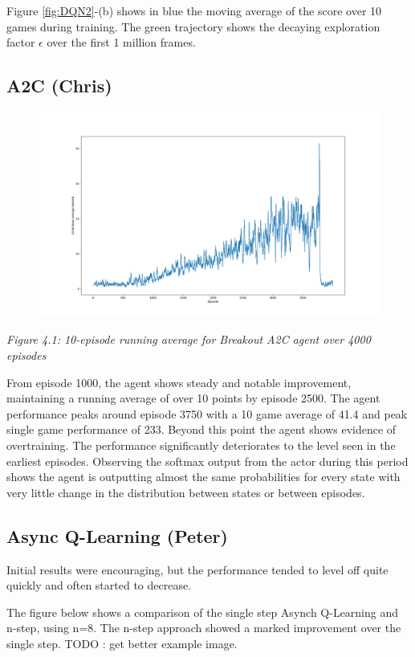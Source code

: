 \documentclass{article}
\begin{document}
Figure \ref{fig:DQN2}-(b) shows in blue the moving average of the score over 10 games during training. The green trajectory shows the decaying exploration factor $\epsilon$ over the first 1 million frames. 


\subsection{A2C (Chris)}

\begin{figure}[h]
\includegraphics[scale=0.2]{A2C4000.png}
\end{figure}
\emph{Figure 4.1: 10-episode running average for Breakout A2C agent over 4000 episodes}

From episode 1000, the agent shows steady and notable improvement, maintaining a running average of over 10 points by episode 2500. The agent performance peaks around episode 3750 with a 10 game average of 41.4 and peak single game performance of 233. Beyond this point the agent shows evidence of overtraining. The performance significantly deteriorates to the level seen in the earliest episodes. Observing the softmax output from the actor during this period shows the agent is outputting almost the same probabilities for every state with very little change in the distribution between states or between episodes.

\subsection{Async Q-Learning (Peter)}

Initial results were encouraging, but the performance tended to level off quite quickly and often started to decrease.

The figure below shows a comparison of the single step Asynch Q-Learning and n-step, using n=8. The n-step approach showed a marked improvement over the single step. TODO : get better example image.
\end{document}
